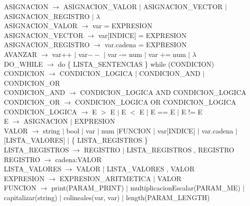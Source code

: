 \documentclass[10pt,a4paper]{article}
\begin{document}
ASIGNACION $\rightarrow$ ASIGNACION\_VALOR $|$ ASIGNACION\_VECTOR $|$ ASIGNACION\_REGISTRO $|$ $\lambda$ \\

ASIGNACION\_VALOR $\rightarrow$ var = EXPRESION \\

ASIGNACION\_VECTOR $\rightarrow$ var[INDICE] = EXPRESION \\

ASIGNACION\_REGISTRO $\rightarrow$ var.cadena = EXPRESION \\

AVANZAR $\rightarrow$ var++ $|$ var$--$ $|$ var -= num $|$ var += num $|$ $\lambda$ \\

DO\_WHILE $\rightarrow$ do \{ LISTA\_SENTENCIAS \} while (CONDICION) \\

CONDICION $\rightarrow$ CONDICION\_LOGICA $|$ CONDICION\_AND $|$ CONDICION\_OR \\

CONDICION\_AND $\rightarrow$ CONDICION\_LOGICA AND CONDICION\_LOGICA \\

CONDICION\_OR $\rightarrow$ CONDICION\_LOGICA OR CONDICION\_LOGICA \\

CONDICION\_LOGICA $\rightarrow$ E $>$ E $|$ E $<$ E $|$ E == E $|$ E != E \\

E $\rightarrow$ ASIGNACION $|$ EXPRESION \\

VALOR $\rightarrow$ string $|$ bool $|$ var $|$ num $|$FUNCION $|$ var[INDICE] $|$ var.cadena $|$ [LISTA\_VALORES] $|$ \{ LISTA\_REGISTROS \}\\

LISTA\_REGISTROS $\rightarrow$ REGISTRO $|$ LISTA\_REGISTROS , REGISTRO \\

REGISTRO $\rightarrow$ cadena:VALOR \\

LISTA\_VALORES $\rightarrow$ VALOR $|$ LISTA\_VALORES , VALOR \\

EXPRESION $\rightarrow$  EXPRESION\_ARITMETICA $|$ VALOR \\

FUNCION $\rightarrow$ print(PARAM\_PRINT) $|$  multiplicacionEscalar(PARAM\_ME) $|$  capitalizar(string) $|$  colineales(var, var) $|$ length(PARAM\_LENGTH) \\
\end{document}
